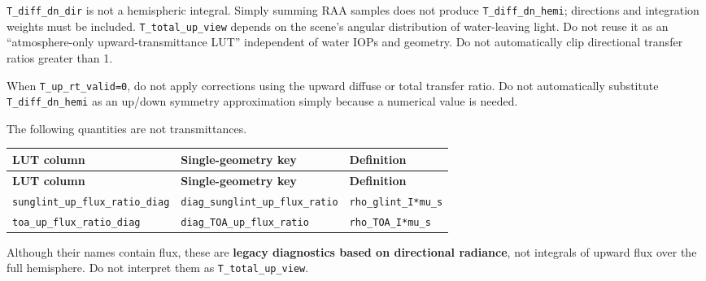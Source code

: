 \texttt{T\_\allowbreak{}diff\_\allowbreak{}dn\_\allowbreak{}dir} is not a hemispheric integral. Simply summing RAA samples does not produce \texttt{T\_\allowbreak{}diff\_\allowbreak{}dn\_\allowbreak{}hemi}; directions and integration weights must be included. \texttt{T\_\allowbreak{}total\_\allowbreak{}up\_\allowbreak{}view} depends on the scene's angular distribution of water-leaving light. Do not reuse it as an “atmosphere-only upward-transmittance LUT” independent of water IOPs and geometry. Do not automatically clip directional transfer ratios greater than 1.

When \texttt{T\_\allowbreak{}up\_\allowbreak{}rt\_\allowbreak{}valid=\allowbreak{}0}, do not apply corrections using the upward diffuse or total transfer ratio. Do not automatically substitute \texttt{T\_\allowbreak{}diff\_\allowbreak{}dn\_\allowbreak{}hemi} as an up/down symmetry approximation simply because a numerical value is needed.

The following quantities are not transmittances.


{\TableFont
\begin{longtable}{@{}>{\raggedright\arraybackslash}p{}>{\raggedright\arraybackslash}p{}>{\raggedright\arraybackslash}p{}@{}}
\toprule
\textbf{LUT column} & \textbf{Single-geometry key} & \textbf{Definition} \\
\midrule
\endfirsthead
\toprule
\textbf{LUT column} & \textbf{Single-geometry key} & \textbf{Definition} \\
\midrule
\endhead
\bottomrule
\endfoot
\texttt{sunglint\_\allowbreak{}up\_\allowbreak{}flux\_\allowbreak{}ratio\_\allowbreak{}diag} & \texttt{diag\_\allowbreak{}sunglint\_\allowbreak{}up\_\allowbreak{}flux\_\allowbreak{}ratio} & \texttt{rho\_\allowbreak{}glint\_\allowbreak{}I*mu\_\allowbreak{}s} \\
\texttt{toa\_\allowbreak{}up\_\allowbreak{}flux\_\allowbreak{}ratio\_\allowbreak{}diag} & \texttt{diag\_\allowbreak{}TOA\_\allowbreak{}up\_\allowbreak{}flux\_\allowbreak{}ratio} & \texttt{rho\_\allowbreak{}TOA\_\allowbreak{}I*mu\_\allowbreak{}s} \\
\end{longtable}
}

Although their names contain flux, these are \textbf{legacy diagnostics based on directional radiance}, not integrals of upward flux over the full hemisphere. Do not interpret them as \texttt{T\_\allowbreak{}total\_\allowbreak{}up\_\allowbreak{}view}.

